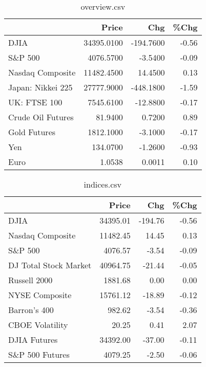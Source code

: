 \documentclass{article}%
\begin{document}
\begin{table}[htbp]%
\caption{overview.csv}%
\centering%
\begin{adjustbox}{width=1\textwidth}%
\begin{tabular}{lrrr}
\toprule
                  &      Price &       Chg &  \%Chg \\
\midrule
             DJIA & 34395.0100 & -194.7600 & -0.56 \\
          S\&P 500 &  4076.5700 &   -3.5400 & -0.09 \\
 Nasdaq Composite & 11482.4500 &   14.4500 &  0.13 \\
Japan: Nikkei 225 & 27777.9000 & -448.1800 & -1.59 \\
     UK: FTSE 100 &  7545.6100 &  -12.8800 & -0.17 \\
Crude Oil Futures &    81.9400 &    0.7200 &  0.89 \\
     Gold Futures &  1812.1000 &   -3.1000 & -0.17 \\
              Yen &   134.0700 &   -1.2600 & -0.93 \\
             Euro &     1.0538 &    0.0011 &  0.10 \\
\bottomrule
\end{tabular}
%
\end{adjustbox}%
\end{table}

%


\begin{table}[htbp]%
\caption{indices.csv}%
\centering%
\begin{adjustbox}{width=1\textwidth}%
\begin{tabular}{lrrr}
\toprule
                      &    Price &     Chg &  \%Chg \\
\midrule
                 DJIA & 34395.01 & -194.76 & -0.56 \\
     Nasdaq Composite & 11482.45 &   14.45 &  0.13 \\
              S\&P 500 &  4076.57 &   -3.54 & -0.09 \\
DJ Total Stock Market & 40964.75 &  -21.44 & -0.05 \\
         Russell 2000 &  1881.68 &    0.00 &  0.00 \\
       NYSE Composite & 15761.12 &  -18.89 & -0.12 \\
         Barron's 400 &   982.62 &   -3.54 & -0.36 \\
      CBOE Volatility &    20.25 &    0.41 &  2.07 \\
         DJIA Futures & 34392.00 &  -37.00 & -0.11 \\
      S\&P 500 Futures &  4079.25 &   -2.50 & -0.06 \\
\bottomrule
\end{tabular}
%
\end{adjustbox}%
\end{table}
\end{document}
